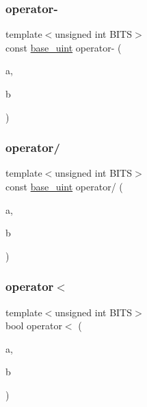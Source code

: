 \mbox{\label{classbase__uint_a42603f675219a79c1087da39677dd6d3}} 
\subsubsection{\texorpdfstring{operator-\/}{operator-}}
{\footnotesize\ttfamily template$<$unsigned int B\+I\+TS$>$ \\
const \mbox{\hyperlink{classbase__uint}{base\+\_\+uint}} operator-\/ (\begin{DoxyParamCaption}\item[{const \mbox{\hyperlink{classbase__uint}{base\+\_\+uint}}$<$ B\+I\+TS $>$ \&}]{a,  }\item[{const \mbox{\hyperlink{classbase__uint}{base\+\_\+uint}}$<$ B\+I\+TS $>$ \&}]{b }\end{DoxyParamCaption})\hspace{0.3cm}{\ttfamily [friend]}}

\mbox{\label{classbase__uint_a3027097ea3718db496e486d5c64a6bbd}} 
\subsubsection{\texorpdfstring{operator/}{operator/}}
{\footnotesize\ttfamily template$<$unsigned int B\+I\+TS$>$ \\
const \mbox{\hyperlink{classbase__uint}{base\+\_\+uint}} operator/ (\begin{DoxyParamCaption}\item[{const \mbox{\hyperlink{classbase__uint}{base\+\_\+uint}}$<$ B\+I\+TS $>$ \&}]{a,  }\item[{const \mbox{\hyperlink{classbase__uint}{base\+\_\+uint}}$<$ B\+I\+TS $>$ \&}]{b }\end{DoxyParamCaption})\hspace{0.3cm}{\ttfamily [friend]}}

\mbox{\label{classbase__uint_a89272b5112f90ba683c0f066ba1426c1}} 
\subsubsection{\texorpdfstring{operator$<$}{operator<}}
{\footnotesize\ttfamily template$<$unsigned int B\+I\+TS$>$ \\
bool operator$<$ (\begin{DoxyParamCaption}\item[{const \mbox{\hyperlink{classbase__uint}{base\+\_\+uint}}$<$ B\+I\+TS $>$ \&}]{a,  }\item[{const \mbox{\hyperlink{classbase__uint}{base\+\_\+uint}}$<$ B\+I\+TS $>$ \&}]{b }\end{DoxyParamCaption})\hspace{0.3cm}{\ttfamily [friend]}}

